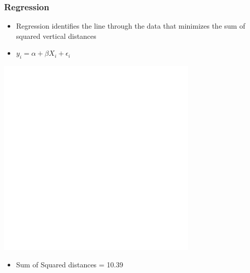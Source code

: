 \documentclass[xcolor=x11names,compress]{beamer}\usepackage[]{graphicx}\usepackage[]{color}
\makeatletter
\def\maxwidth{ %
  \ifdim\Gin@nat@width>\linewidth
    \linewidth
  \else
    \Gin@nat@width
  \fi
}
\newenvironment{knitrout}{}{} %
\renewcommand{\(}{\begin{columns}}
\renewcommand{\)}{\end{columns}}
\newcommand{\<}[1]{\begin{column}{#1}}
\renewcommand{\>}{\end{column}}
\makeatother
\begin{document}
\begin{frame}
\frametitle{Regression}
\begin{itemize}
\item Regression identifies the line through the data that minimizes the sum of squared vertical distances 
\item $y_i = \alpha + \beta X_i + \epsilon_i$
\end{itemize}
\begin{multicols}{2}
\begin{knitrout}
\color{fgcolor}
\includegraphics[width=\maxwidth]{figure/graph_reg3-1} 

\end{knitrout}
\columnbreak
\begin{itemize}
\item Sum of Squared distances = 10.39
\end{itemize}
\end{multicols}
\end{frame}
\end{document}
